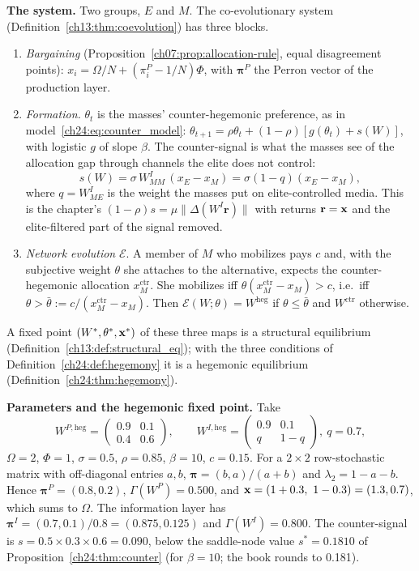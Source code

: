 \documentclass[../solutions_manual.tex]{subfiles}
\begin{document}
 \textbf{The system.} Two groups, $E$ and $M$. The co-evolutionary system (Definition~\ref{ch13:thm:coevolution}) has three blocks.
\begin{enumerate}
\item \emph{Bargaining} (Proposition~\ref{ch07:prop:allocation-rule}, equal disagreement points): $x_i = \Omega/N + (\pi^P_i - 1/N)\Phi$, with $\boldsymbol{\pi}^P$ the Perron vector of the production layer.
\item \emph{Formation.} $\theta_t$ is the masses' counter-hegemonic preference, as in model~\eqref{ch24:eq:counter_model}:
$\theta_{t+1} = \rho\theta_t + (1-\rho)[g(\theta_t) + s(W)]$, with logistic $g$ of slope $\beta$. The counter-signal is what the masses see of the allocation gap through channels the elite does not control:
\[
s(W) = \sigma\,W^I_{MM}\,(x_E - x_M) = \sigma(1-q)(x_E - x_M),
\]
where $q = W^I_{ME}$ is the weight the masses put on elite-controlled media. This is the chapter's $(1-\rho)s = \mu\|\Delta(W^I\mathbf{r})\|$ with returns $\mathbf{r} = \mathbf{x}$ and the elite-filtered part of the signal removed.
\item \emph{Network evolution} $\mathcal{E}$. A member of $M$ who mobilizes pays $c$ and, with the subjective weight $\theta$ she attaches to the alternative, expects the counter-hegemonic allocation $x_M^{\text{ctr}}$. She mobilizes iff $\theta(x_M^{\text{ctr}} - x_M) > c$, i.e.\ iff $\theta > \bar\theta := c/(x_M^{\text{ctr}} - x_M)$. Then $\mathcal{E}(W;\theta) = W^{\text{heg}}$ if $\theta \le \bar\theta$ and $W^{\text{ctr}}$ otherwise.
\end{enumerate}
A fixed point $(W^*,\theta^*,\mathbf{x}^*)$ of these three maps is a structural equilibrium (Definition~\ref{ch13:def:structural_eq}); with the three conditions of Definition~\ref{ch24:def:hegemony} it is a hegemonic equilibrium (Definition~\ref{ch24:thm:hegemony}).

 \textbf{Parameters and the hegemonic fixed point.} Take
\[
W^{P,\text{heg}} = \begin{pmatrix} 0.9 & 0.1\\ 0.4 & 0.6\end{pmatrix},\qquad
W^{I,\text{heg}} = \begin{pmatrix} 0.9 & 0.1\\ q & 1-q\end{pmatrix},\ q = 0.7,
\]
$\Omega = 2$, $\Phi = 1$, $\sigma = 0.5$, $\rho = 0.85$, $\beta = 10$, $c = 0.15$. For a $2\times2$ row-stochastic matrix with off-diagonal entries $a, b$, $\boldsymbol{\pi} = (b, a)/(a+b)$ and $\lambda_2 = 1-a-b$. Hence $\boldsymbol{\pi}^P = (0.8, 0.2)$, $\Gamma(W^P) = 0.500$, and $\mathbf{x} = (1 + 0.3,\ 1 - 0.3) = (1.3, 0.7)$, which sums to $\Omega$. The information layer has $\boldsymbol{\pi}^I = (0.7, 0.1)/0.8 = (0.875, 0.125)$ and $\Gamma(W^I) = 0.800$. The counter-signal is $s = 0.5 \times 0.3 \times 0.6 = 0.090$, below the saddle-node value $s^* = 0.1810$ of Proposition~\ref{ch24:thm:counter} (for $\beta = 10$; the book rounds to 0.181).
\end{document}
